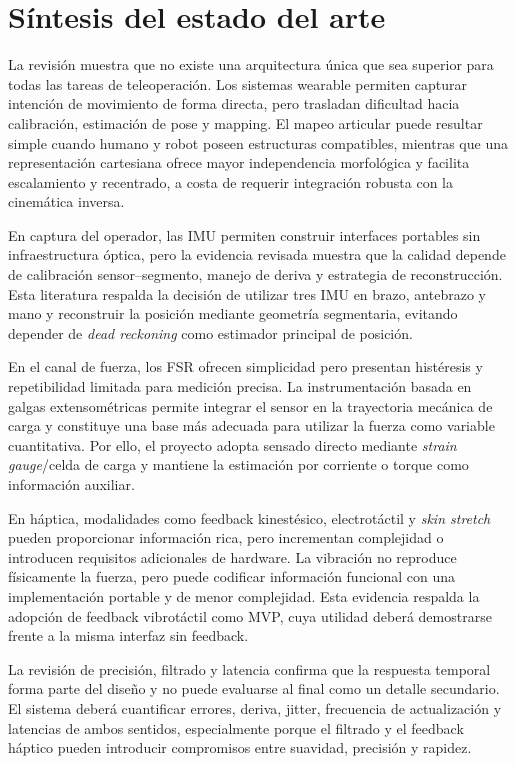 \section{Síntesis del estado del arte}

La revisión muestra que no existe una arquitectura única que sea superior para todas las tareas de teleoperación. Los sistemas wearable permiten capturar intención de movimiento de forma directa, pero trasladan dificultad hacia calibración, estimación de pose y mapping. El mapeo articular puede resultar simple cuando humano y robot poseen estructuras compatibles, mientras que una representación cartesiana ofrece mayor independencia morfológica y facilita escalamiento y recentrado, a costa de requerir integración robusta con la cinemática inversa.

En captura del operador, las IMU permiten construir interfaces portables sin infraestructura óptica, pero la evidencia revisada muestra que la calidad depende de calibración sensor--segmento, manejo de deriva y estrategia de reconstrucción. Esta literatura respalda la decisión de utilizar tres IMU en brazo, antebrazo y mano y reconstruir la posición mediante geometría segmentaria, evitando depender de \textit{dead reckoning} como estimador principal de posición.

En el canal de fuerza, los FSR ofrecen simplicidad pero presentan histéresis y repetibilidad limitada para medición precisa. La instrumentación basada en galgas extensométricas permite integrar el sensor en la trayectoria mecánica de carga y constituye una base más adecuada para utilizar la fuerza como variable cuantitativa. Por ello, el proyecto adopta sensado directo mediante \textit{strain gauge}/celda de carga y mantiene la estimación por corriente o torque como información auxiliar.

En háptica, modalidades como feedback kinestésico, electrotáctil y \textit{skin stretch} pueden proporcionar información rica, pero incrementan complejidad o introducen requisitos adicionales de hardware. La vibración no reproduce físicamente la fuerza, pero puede codificar información funcional con una implementación portable y de menor complejidad. Esta evidencia respalda la adopción de feedback vibrotáctil como MVP, cuya utilidad deberá demostrarse frente a la misma interfaz sin feedback.

La revisión de precisión, filtrado y latencia confirma que la respuesta temporal forma parte del diseño y no puede evaluarse al final como un detalle secundario. El sistema deberá cuantificar errores, deriva, jitter, frecuencia de actualización y latencias de ambos sentidos, especialmente porque el filtrado y el feedback háptico pueden introducir compromisos entre suavidad, precisión y rapidez.

